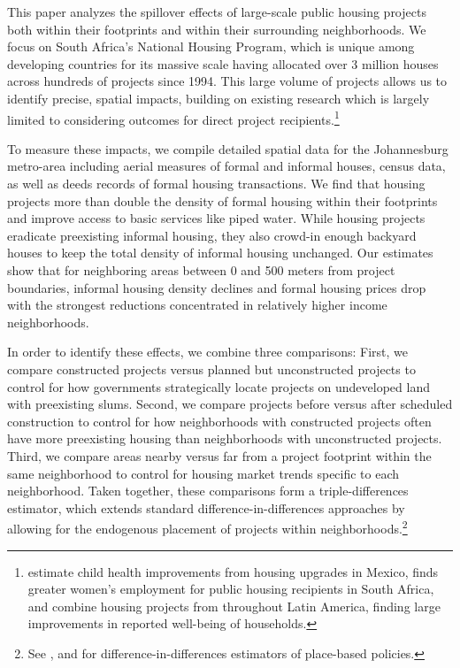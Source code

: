 \documentclass[12pt]{article}
\begin{document}
This paper analyzes the spillover effects of large-scale public housing projects both within their footprints and within their surrounding neighborhoods.  We focus on South Africa's National Housing Program, which is unique among developing countries for its massive scale having allocated over 3 million houses across hundreds of projects since 1994.  This large volume of projects allows us to identify precise, spatial impacts, building on existing research which is largely limited to considering outcomes for direct project recipients.\footnote{\cite{cattaneo2009housing} estimate child health improvements from housing upgrades in Mexico, \cite{franklin2016enabled} finds greater women's employment for public housing recipients in South Africa, and \cite{galiani2017shelter} combine housing projects from throughout Latin America, finding large improvements in reported well-being of households.}  

To measure these impacts, we compile detailed spatial data for the Johannesburg metro-area including aerial measures of formal and informal houses, census data, as well as deeds records of formal housing transactions.  We find that housing projects more than double the density of formal housing within their footprints and improve access to basic services like piped water.  While housing projects eradicate preexisting informal housing, they also crowd-in enough backyard houses to keep the total density of informal housing unchanged.  Our estimates show that for neighboring areas between 0 and 500 meters from project boundaries, informal housing density declines and formal housing prices drop with the strongest reductions concentrated in relatively higher income neighborhoods.

In order to identify these effects, we combine three comparisons:  First, we compare constructed projects versus planned but unconstructed projects to control for how governments strategically locate projects on undeveloped land with preexisting slums.  Second, we compare projects before versus after scheduled construction to control for how neighborhoods with constructed projects often have more preexisting housing than neighborhoods with unconstructed projects.  Third, we compare areas nearby versus far from a project footprint within the same neighborhood to control for housing market trends specific to each neighborhood.  Taken together, these comparisons form a triple-differences estimator, which extends standard difference-in-differences approaches by allowing for the endogenous placement of projects within neighborhoods.\footnote{See \cite{rossi2010housing,hornbeck2017creative}, and \cite{diamond2016wants} for difference-in-differences estimators of place-based policies.}  
\end{document}
